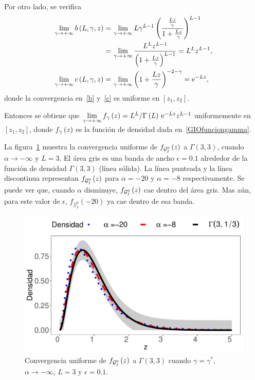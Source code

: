 \begin{dem}
	Por otro lado, se verifica 
	\begin{align}
	\label{b}
	\nonumber \lim_{\gamma\to+\infty} b\left( L,\gamma,z \right) =
	&\, \lim_{\gamma\to+\infty}L\gamma^{L-1}\left( \frac{\frac{Lz}{\gamma}}{1+\frac{Lz}{\gamma}} \right)^{L-1} \\
	= &\, \lim_{\gamma\to+\infty} \frac{L^{L} z^{L-1}}{\left( 1+\frac{Lz}{\gamma} \right)^{L-1}} = L^{L} z^{L-1},\\
	\lim_{\gamma\to+\infty} c\left( L,\gamma,z \right) = &\, \lim_{\gamma\to+\infty}\left( 1+\frac{Lz}{\gamma} \right)^{-2-\gamma} = \mathrm{e}^{-Lz},
	\label{c}
	\end{align}
	donde la convergencia en~\eqref{b} y~\eqref{c} es uniforme en $[z_{1},z_{2}]$.
	
	Entonces se obtiene que $\lim\limits_{\gamma\to+\infty}f_{\gamma}\left( z \right) = L^{L}/\Gamma\left( L \right)\,\mathrm{e}^{-Lz}z^{L-1}$ uniformemente en $[z_{1},z_{2}]$, donde $f_{\gamma}\left( z \right)$ es la función de densidad dada en~\eqref{GIOfunciongamma}.
\end{dem}

La figura~\ref{ConvInfinito} muestra la convergencia uniforme de $f_{\mathcal{G}_I^0}\left( z \right)$ a $\Gamma(3,3)$, cuando $\alpha \to -\infty$ y $L=3$. 
El área gris es una banda de ancho $\epsilon=0.1$ alrededor de la función de densidad $\Gamma(3,3)$ (línea sólida). 
La línea punteada y la línea discontinua representan $f_{\mathcal{G}_I^0}\left( z \right)$ para $\alpha=-20$ y $\alpha=-8$ respectivamente. 
Se puede ver que, cuando $\alpha$ disminuye, $f_{\mathcal{G}_I^0}\left( z \right)$ cae dentro del área gris. 
Mas aún, para este valor de $\epsilon$, $f_{\mathcal{G}_I^0}(-20)$ ya cae dentro de esa banda.


\begin{figure}[hbt]
\begin{center}
	\includegraphics[scale=0.8]{../../Figures/Tesis/Capitulo4/ConvUniformeMenosInfinito2.pdf}
	\caption{\label{ConvInfinito}\small{Convergencia uniforme de $f_{\mathcal{G}_I^0}\left( z \right)$ a $\Gamma(3,3)$ cuando $\gamma=\gamma^*$, $\alpha \to -\infty$, $L=3$ y $\epsilon=0.1$.}}
\end{center}
\end{figure} 


